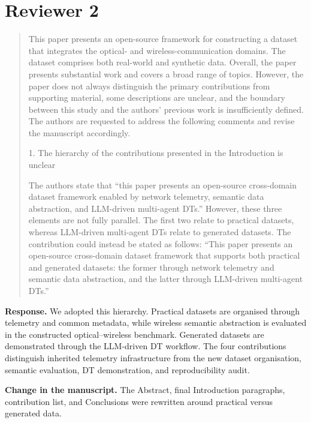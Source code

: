 \documentclass[11pt]{article}
\newenvironment{reviewercomment}{\begin{quote}\color{reviewblue}}{\end{quote}}
\newenvironment{authorresponse}{\color{responsegreen}\textbf{Response.} }{\par\color{black}}
\newcommand{\change}[1]{\par\textbf{Change in the manuscript.} #1\par}
\begin{document}
\section*{Reviewer 2}

\begin{reviewercomment}
This paper presents an open-source framework for constructing a dataset that integrates the optical- and wireless-communication domains. The dataset comprises both real-world and synthetic data. Overall, the paper presents substantial work and covers a broad range of topics. However, the paper does not always distinguish the primary contributions from supporting material, some descriptions are unclear, and the boundary between this study and the authors' previous work is insufficiently defined. The authors are requested to address the following comments and revise the manuscript accordingly.

1. The hierarchy of the contributions presented in the Introduction is unclear

The authors state that ``this paper presents an open-source cross-domain dataset framework enabled by network telemetry, semantic data abstraction, and LLM-driven multi-agent DTs.'' However, these three elements are not fully parallel. The first two relate to practical datasets, whereas LLM-driven multi-agent DTs relate to generated datasets. The contribution could instead be stated as follows: ``This paper presents an open-source cross-domain dataset framework that supports both practical and generated datasets: the former through network telemetry and semantic data abstraction, and the latter through LLM-driven multi-agent DTs.''
\end{reviewercomment}
\begin{authorresponse}
We adopted this hierarchy. Practical datasets are organised through telemetry and common metadata, while wireless semantic abstraction is evaluated in the constructed optical--wireless benchmark. Generated datasets are demonstrated through the LLM-driven DT workflow. The four contributions distinguish inherited telemetry infrastructure from the new dataset organisation, semantic evaluation, DT demonstration, and reproducibility audit.
\end{authorresponse}
\change{The Abstract, final Introduction paragraphs, contribution list, and Conclusions were rewritten around practical versus generated data.}
\end{document}
